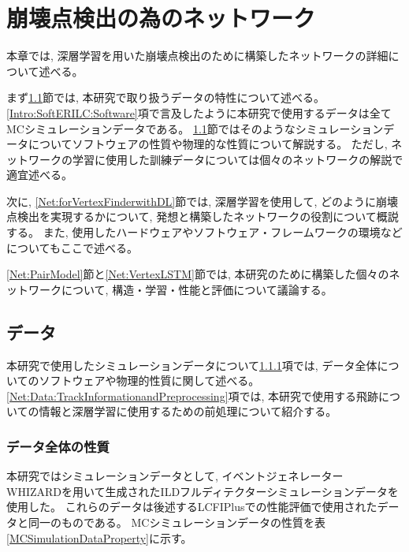 
\chapter{崩壊点検出の為のネットワーク} \label{chap:Networks}

本章では, 深層学習を用いた崩壊点検出のために構築したネットワークの詳細について述べる。

まず\ref{Net:Data}節では, 本研究で取り扱うデータの特性について述べる。
\ref{Intro:SoftERILC:Software}項で言及したように本研究で使用するデータは全てMCシミュレーションデータである。
\ref{Net:Data}節ではそのようなシミュレーションデータについてソフトウェアの性質や物理的な性質について解説する。
ただし, ネットワークの学習に使用した訓練データについては個々のネットワークの解説で適宜述べる。

次に, \ref{Net:forVertexFinderwithDL}節では, 深層学習を使用して, どのように崩壊点検出を実現するかについて, 発想と構築したネットワークの役割について概説する。
また, 使用したハードウェアやソフトウェア・フレームワークの環境などについてもここで述べる。

\ref{Net:PairModel}節と\ref{Net:VertexLSTM}節では, 本研究のために構築した個々のネットワークについて, 構造・学習・性能と評価について議論する。


\section{データ} \label{Net:Data}

本研究で使用したシミュレーションデータについて\ref{Net:Data:DataProperty}項では, データ全体についてのソフトウェアや物理的性質に関して述べる。
\ref{Net:Data:TrackInformationandPreprocessing}項では, 本研究で使用する飛跡についての情報と深層学習に使用するための前処理について紹介する。


\subsection{データ全体の性質} \label{Net:Data:DataProperty}

本研究ではシミュレーションデータとして, イベントジェネレーター　WHIZARD\cite{WHIZARDpaper}を用いて生成されたILDフルディテクターシミュレーションデータを使用した。
これらのデータは後述するLCFIPlusでの性能評価\cite{LCFIPlusPaper}で使用されたデータと同一のものである。
MCシミュレーションデータの性質を表\ref{MCSimulationDataProperty}に示す。

